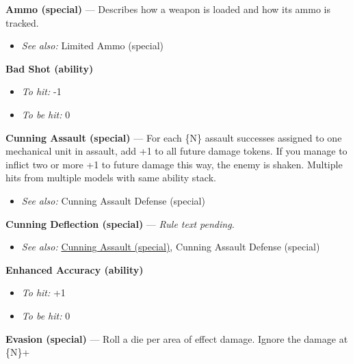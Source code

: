 \documentclass[a4paper,12pt]{article}
\begin{document}
\label{rule-special-ammo}%
\noindent\textbf{Ammo (special)} --- Describes how a weapon is loaded and how its ammo is tracked.
\begin{itemize}
\item \textit{See also:} Limited Ammo (special)
\end{itemize}


\label{rule-ability-bad-shot}%
\noindent\textbf{Bad Shot (ability)}\begin{itemize}
\item \textit{To hit:} -1
\item \textit{To be hit:} 0
\end{itemize}


\label{rule-special-cunning-assault}%
\noindent\textbf{Cunning Assault (special)} --- For each \{N\} assault successes assigned to one mechanical unit in assault, add +1 to all future damage tokens. If you manage to inflict two or more +1 to future damage this way, the enemy is shaken. Multiple hits from multiple models with same ability stack.
\begin{itemize}
\item \textit{See also:} Cunning Assault Defense (special)
\end{itemize}


\label{rule-special-cunning-deflection}%
\noindent\textbf{Cunning Deflection (special)} --- \textit{Rule text pending.}\begin{itemize}
\item \textit{See also:} \hyperref[rule-special-cunning-assault]{Cunning Assault (special)}, Cunning Assault Defense (special)
\end{itemize}


\label{rule-ability-enhanced-accuracy}%
\noindent\textbf{Enhanced Accuracy (ability)}\begin{itemize}
\item \textit{To hit:} +1
\item \textit{To be hit:} 0
\end{itemize}


\label{rule-special-evasion}%
\noindent\textbf{Evasion (special)} --- Roll a die per area of effect damage. Ignore the damage at \{N\}+
\end{document}
